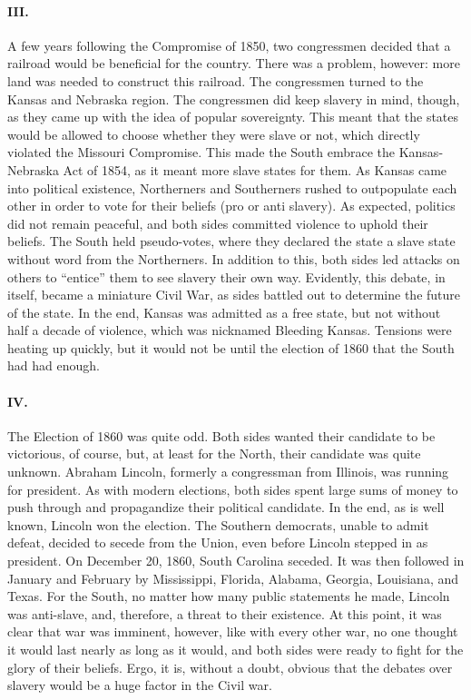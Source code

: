 \documentclass[12pt]{article}
\begin{document}
  \paragraph{III.} A few years following the Compromise of 1850, two congressmen decided that a railroad would be beneficial for the country. There was a problem, however: more land was needed to construct this railroad. The congressmen turned to the Kansas and Nebraska region. The congressmen did keep slavery in mind, though, as they came up with the idea of popular sovereignty. This meant that the states would be allowed to choose whether they were slave or not, which directly violated the Missouri Compromise. This made the South embrace the Kansas-Nebraska Act of 1854, as it meant more slave states for them. As Kansas came into political existence, Northerners and Southerners rushed to outpopulate each other in order to vote for their beliefs (pro or anti slavery). As expected, politics did not remain peaceful, and both sides committed violence to uphold their beliefs. The South held pseudo-votes, where they declared the state a slave state without word from the Northerners. In addition to this, both sides led attacks on others to ``entice'' them to see slavery their own way. Evidently, this debate, in itself, became a miniature Civil War, as sides battled out to determine the future of the state. In the end, Kansas was admitted as a free state, but not without half a decade of violence, which was nicknamed Bleeding Kansas. Tensions were heating up quickly, but it would not be until the election of 1860 that the South had had enough.

  \paragraph{IV.} The Election of 1860 was quite odd. Both sides wanted their candidate to be victorious, of course, but, at least for the North, their candidate was quite unknown. Abraham Lincoln, formerly a congressman from Illinois, was running for president. As with modern elections, both sides spent large sums of money to push through and propagandize their political candidate. In the end, as is well known, Lincoln won the election. The Southern democrats, unable to admit defeat, decided to secede from the Union, even before Lincoln stepped in as president. On December 20, 1860, South Carolina seceded. It was then followed in January and February by Mississippi, Florida, Alabama, Georgia, Louisiana, and Texas. For the South, no matter how many public statements he made, Lincoln was anti-slave, and, therefore, a threat to their existence. At this point, it was clear that war was imminent, however, like with every other war, no one thought it would last nearly as long as it would, and both sides were ready to fight for the glory of their beliefs. Ergo, it is, without a doubt, obvious that the debates over slavery would be a huge factor in the Civil war.
\end{document}
